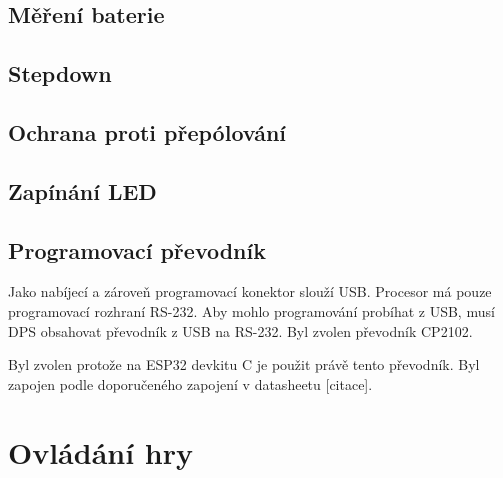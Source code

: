 \section{Měření baterie}

\section{Stepdown}

\section{Ochrana proti přepólování}

\section{Zapínání LED}

\section{Programovací převodník}
Jako nabíjecí a zároveň programovací konektor slouží USB. Procesor má pouze programovací rozhraní RS-232. Aby mohlo programování probíhat z USB, 
musí DPS obsahovat převodník z USB na RS-232. Byl zvolen převodník CP2102. 

Byl zvolen protože na ESP32 devkitu C je použit právě tento převodník. Byl zapojen podle doporučeného zapojení v datasheetu [citace].

\chapter{Ovládání hry}